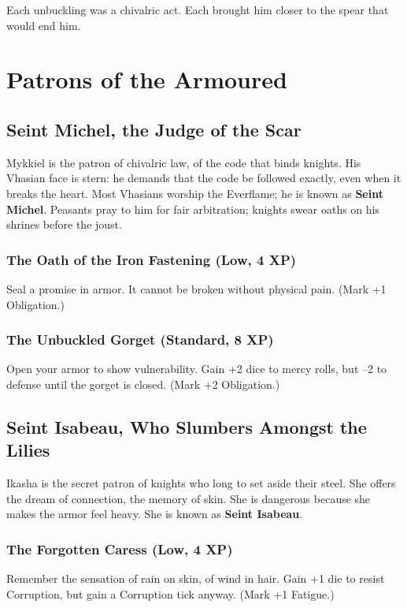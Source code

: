 \documentclass[11pt,twoside]{book}
\begin{document}
Each unbuckling was a chivalric act.  Each brought him closer to the spear that would end him.

\chapter{Patrons of the Armoured}\label{ch:patrons}

\section{Seint Michel, the Judge of the Scar}
Mykkiel is the patron of chivalric law, of the code that binds knights. His Vhasian face is stern: he demands that the code be followed exactly, even when it breaks the heart. Most Vhasians worship the Everflame; he is known as \textbf{Seint Michel}.
Peasants pray to him for fair arbitration; knights swear oaths on his shrines before the joust.

\subsection*{The Oath of the Iron Fastening (Low, 4 XP)}
Seal a promise in armor. It cannot be broken without physical pain. (Mark +1 Obligation.)

\subsection*{The Unbuckled Gorget (Standard, 8 XP)}
Open your armor to show vulnerability. Gain +2 dice to mercy rolls, but --2 to defense until the gorget is closed. (Mark +2 Obligation.)

\section{Seint Isabeau, Who Slumbers Amongst the Lilies}
Ikasha is the secret patron of knights who long to set aside their steel. She offers the dream of connection, the memory of skin. She is dangerous because she makes the armor feel heavy. She is known as \textbf{Seint Isabeau}.

\subsection*{The Forgotten Caress (Low, 4 XP)}
Remember the sensation of rain on skin, of wind in hair. Gain +1 die to resist Corruption, but gain a Corruption tick anyway. (Mark +1 Fatigue.)
\end{document}
